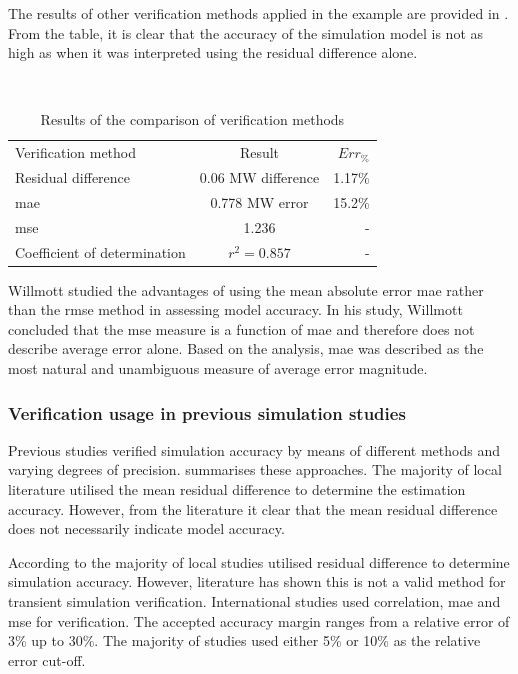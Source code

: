  The results of other verification methods applied in the example are provided in . From the table, it is clear that the accuracy of the simulation model is not as high as when it was interpreted using the residual difference alone.
 	\par 
 \begin{table}[!htbp]
 	\caption{Results of the comparison of verification methods}\hspace{2em}\\
 	\centering
 	\begin{tabular}{lcr}
 		\hline
 		Verification method & Result & $Err_{\%}$\\
 		\hhline{===}
 		Residual difference     & 0.06 MW difference & 1.17\% \\
 		\gls{mae} 					 & 0.778 MW error & 15.2\% \\
 		\gls{mse} 				   & 1.236  & -\\
 		Coefficient of determination & $r^2 =0.857$  & -\\
 		\hline
 	\end{tabular} 
 \label{Philip verification table}
 \end{table}
 	Willmott \cite{willmott2005advantages} studied the advantages of using the mean absolute error \gls{mae} rather than the \gls{rmse} method in assessing model accuracy. In his study, Willmott concluded that the \gls{mse} measure is a function of \gls{mae} and therefore does not describe average error alone. Based on the analysis, \gls{mae} was described as the most natural and unambiguous measure of average error magnitude.

 	\subsubsection{Verification usage in previous simulation studies}
 	Previous studies verified simulation accuracy by means of different methods and varying degrees of precision.  summarises these approaches. The majority of local literature utilised the mean residual difference to determine the estimation accuracy. However, from the literature it clear that the mean residual difference does not necessarily indicate model accuracy. 
 	\par 
 	 According to  the majority of local studies utilised residual difference to determine simulation accuracy. However, literature has shown this is not a valid method for transient simulation verification. International studies used correlation, \gls{mae} and \gls{mse} for verification. The accepted accuracy margin ranges from a relative error of 3\% up to 30\%. The majority of studies used either 5\% or 10\%  as the relative error cut-off.
 	 
